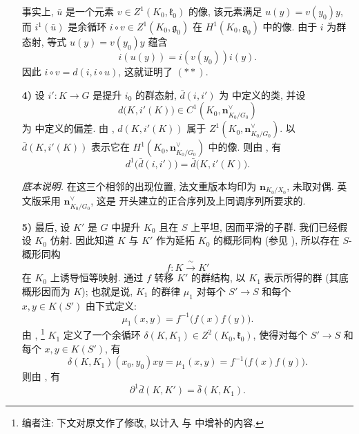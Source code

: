 \begin{enumerate}
事实上, \(\bar u\) 是一个元素 \(v\in Z^1(K_0,\mathfrak k_0)\) 的像,
该元素满足 \(u(y)=v(y_0)y\), 而 \(i^1(\bar u)\) 是余循环
\(i\circ v\in Z^1(K_0,\mathfrak g_0)\) 在
\(H^1(K_0,\mathfrak g_0)\) 中的像. 由于 \(i\) 为群态射,
等式 \(u(y)=v(y_0)y\) 蕴含
\[
 i(u(y))=i(v(y_0))i(y).
\]
因此 \(i\circ v=d(i,i\circ u)\), 这就证明了 \((**)\).

\item[\textbf{4)}]
设 \(i':K\to G\) 是提升 \(i_0\) 的群态射,
\(\bar d(i,i')\) 为  中定义的类,
并设
\[
 d\bigl(K,i'(K)\bigr)
 \in C^1(K_0,\mathbf n^{\vee}_{K_0/G_0})
\]
为  中定义的偏差.
由 ,
\(d(K,i'(K))\) 属于 \(Z^1(K_0,\mathbf n^{\vee}_{K_0/G_0})\).
以 \(\bar d(K,i'(K))\) 表示它在 \(H^1(K_0,\mathbf n^{\vee}_{K_0/G_0})\)
中的像. 则由 , 有
\begin{equation}
 d^1\bigl(\bar d(i,i')\bigr)=\bar d\bigl(K,i'(K)\bigr).
 \tag{\(\dagger\)}\label{sga3:iii:paragraph:4-38:equation:dagger}
\end{equation}
\par\smallskip
\noindent\emph{底本说明.} 在这三个相邻的出现位置, 法文重版本均印为
\(\mathbf n_{K_0/X_0}\), 未取对偶.
英文版采用 \(\mathbf n^{\vee}_{K_0/G_0}\),
这是  开头建立的正合序列及上同调序列所要求的.

\item[\textbf{5)}]
最后, 设 \(K'\) 是 \(G\) 中提升 \(K_0\) 且在 \(S\) 上平坦, 因而平滑的子群.
我们已经假设 \(K_0\) 仿射. 因此知道 \(K\) 与 \(K'\)
作为延拓 \(K_0\) 的概形同构 (参见 ),
所以存在 \(S\)-概形同构
\[
 f:K\xrightarrow{\ \sim\ }K'
\]
在 \(K_0\) 上诱导恒等映射. 通过 \(f\) 转移 \(K'\) 的群结构,
以 \(K_1\) 表示所得的群 (其底概形因而为 \(K\));
也就是说, \(K_1\) 的群律 \(\mu_1\) 对每个 \(S'\to S\)
和每个 \(x,y\in K(S')\) 由下式定义:
\[
 \mu_1(x,y)=f^{-1}\bigl(f(x)f(y)\bigr).
\]
由 ,
\footnote{编者注: 下文对原文作了修改,
以计入  与
 中增补的内容.}
\(K_1\) 定义了一个余循环 \(\delta(K,K_1)\in Z^2(K_0,\mathfrak k_0)\),
使得对每个 \(S'\to S\) 和每个 \(x,y\in K(S')\), 有
\[
 \delta(K,K_1)(x_0,y_0)xy
 =\mu_1(x,y)=f^{-1}\bigl(f(x)f(y)\bigr).
\]
则由 , 有
\begin{equation}
 \partial^1\bar d(K,K')=\bar\delta(K,K_1).
 \tag{\(\ddagger\)}\label{sga3:iii:paragraph:4-38:equation:ddagger}
\end{equation}
\end{enumerate}

